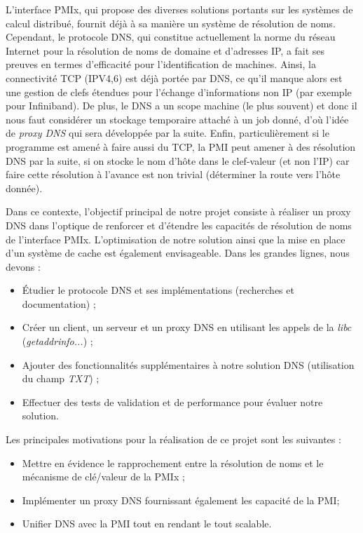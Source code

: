 \documentclass[12pt,a4paper]{article}
\begin{document}
\quad L’interface PMIx, qui propose des diverses solutions portants sur les systèmes de calcul distribué, fournit déjà à sa manière un système de résolution de noms. Cependant, le protocole DNS, qui constitue actuellement la norme du réseau Internet pour la résolution de noms de domaine et d’adresses IP, a fait ses preuves en termes d’efficacité pour l’identification de machines. Ainsi, la connectivité TCP (IPV4,6) est déjà portée par DNS, ce qu'il manque alors est une gestion de clefs étendues pour l'échange d'informations non IP (par exemple pour Infiniband). De plus, le DNS a un scope machine (le plus souvent) et donc il nous faut considérer un stockage temporaire attaché à un job donné, d'où l'idée de \emph{proxy DNS} qui sera développée par la suite. Enfin, particulièrement si le programme est amené à faire aussi du TCP, la PMI peut amener à des résolution DNS par la suite, si on stocke le nom d'hôte dans le clef-valeur (et non l'IP) car faire cette résolution à l'avance est non trivial (déterminer la route vers l'hôte donnée).

\quad Dans ce contexte, l’objectif principal de notre projet consiste à réaliser un proxy DNS dans l’optique de renforcer et d’étendre les capacités de résolution de noms de l’interface PMIx. L’optimisation de notre solution ainsi que la mise en place d’un système de cache est également envisageable.
Dans les grandes lignes, nous devons :
\begin{itemize}
    \item Étudier le protocole DNS et ses implémentations (recherches et documentation) ;
    \item Créer un client, un serveur et un proxy DNS en utilisant les appels de la \textit{libc} (\textit{getaddrinfo...}) ;
    \item Ajouter des fonctionnalités supplémentaires à notre solution DNS (utilisation du champ \textit{TXT}) ;
    \item Effectuer des tests de validation et de performance pour évaluer notre solution.
\end{itemize}

Les principales motivations pour la réalisation de ce projet sont les suivantes :

\begin{itemize}
    \item Mettre en évidence le rapprochement entre la résolution de noms et le mécanisme de clé/valeur de la PMIx ;
    \item Implémenter un proxy DNS fournissant également les capacité de la PMI;
    \item Unifier DNS avec la PMI tout en rendant le tout scalable.
\end{itemize}
\end{document}
